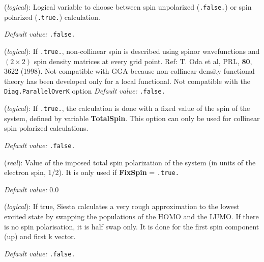 \documentclass[11pt]{article}
\begin{document}
\begin{description}
\itemsep 10pt
\parsep 0pt

\item[{\bf SpinPolarized}] ({\it logical}):
Logical variable to choose between spin unpolarized ({\tt .false.})
or spin polarized ({\tt .true.}) calculation.

{\it Default value:} {\tt .false.}


\item[{\bf NonCollinearSpin}] ({\it logical}):
If {\tt .true.}, non-collinear spin is described using spinor wavefunctions
and $(2 \times 2)$ spin density matrices at every grid point.
Ref: T. Oda et al, PRL, {\bf 80}, 3622 (1998).
Not compatible with GGA because non-collinear density functional
theory has been developed only for a local functional.
Not compatible with the {\tt Diag.ParallelOverK} option
{\it Default value:} {\tt .false.}


\item[{\bf FixSpin}] ({\it logical}):
If {\tt .true.}, the calculation is done with a fixed value of the
spin of the system, defined by variable  {\bf TotalSpin}.
This option can only be used for collinear spin polarized
calculations.

{\it Default value:} {\tt .false.}

\item[{\bf TotalSpin}] ({\it real}):
Value of the imposed total spin polarization of the system (in units of the
electron spin, 1/2). It is only used
if {\bf FixSpin} = {\tt .true.}

{\it Default value:} 0.0

\item[{\bf SingleExcitation}] ({\it logical}):
If true, {\sc Siesta} calculates a very rough approximation to
the lowest excited state by swapping the populations of the HOMO
and the LUMO. If there is no spin polarisation, it is half swap only.
It is done for the first spin component (up) and first k vector.

{\it Default value:} {\tt .false.}


\end{description}
\end{document}
